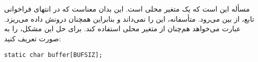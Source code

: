 \section{}
\paragraph{}\label{answer:83}
مسأله این است که  یک متغیر محلی است. این بدان معناست که در انتهای فراخوانی تابع، از بین می‌رود. متأسفانه،  این را نمی‌داند و بنابراین همچنان درونش داده می‌ریزد. عبارت  می‌خواهد هم‌چنان از متغیر محلی استفاده کند. برای حل این مشکل،  را به صورت  تعریف کنید:
\begin{LTR}
        \begin{lstlisting}[style=C++Style]
            static char buffer[BUFSIZ];
        \end{lstlisting}
\end{LTR}
